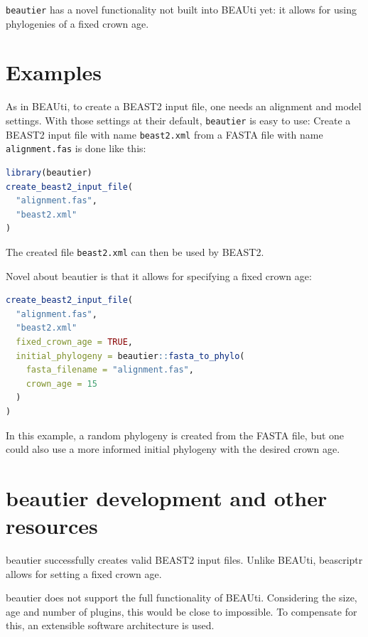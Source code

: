 \documentclass{article}
\begin{document}
\verb;beautier; has a novel functionality not built into BEAUti yet:
it allows for using phylogenies of a fixed crown age. 


\section{Examples}

As in BEAUti, to create a BEAST2 input file, 
one needs an alignment and model settings.
With those settings at their default, \verb;beautier; is easy to use:
Create a BEAST2 input file with name \verb;beast2.xml; from 
a FASTA file with name \verb;alignment.fas; is done like this:

\begin{lstlisting}[language=R, caption=Simplest example]
library(beautier)
create_beast2_input_file(
  "alignment.fas",
  "beast2.xml"
)
\end{lstlisting}

The created file \verb;beast2.xml; can then be used by BEAST2.

Novel about beautier is that it allows for specifying a fixed crown age:

\begin{lstlisting}[language=R, caption=Example with fixed crown age]
create_beast2_input_file(
  "alignment.fas",
  "beast2.xml"
  fixed_crown_age = TRUE,
  initial_phylogeny = beautier::fasta_to_phylo(
    fasta_filename = "alignment.fas", 
    crown_age = 15
  )
)
\end{lstlisting}

In this example, a random phylogeny is created from the FASTA file, but
one could also use a more informed initial phylogeny with the desired crown age. 

\section{beautier development and other resources}

beautier successfully creates valid BEAST2 input files. Unlike BEAUti,
beascriptr allows for setting a fixed crown age.

beautier does not support the full functionality of BEAUti. Considering
the size, age and number of plugins, this would be close to impossible.
To compensate for this, an extensible software architecture is used.
\end{document}
